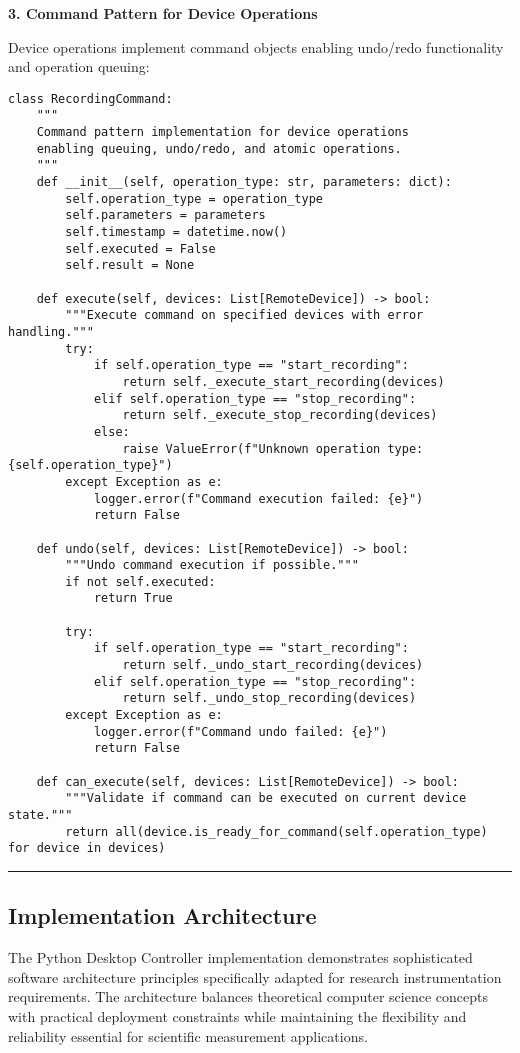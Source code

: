 \documentclass[12pt,a4paper]{article}
\begin{document}
\textbf{3. Command Pattern for Device Operations}

Device operations implement command objects enabling undo/redo functionality and operation queuing:

\begin{verbatim}
class RecordingCommand:
    """
    Command pattern implementation for device operations
    enabling queuing, undo/redo, and atomic operations.
    """
    def __init__(self, operation_type: str, parameters: dict):
        self.operation_type = operation_type
        self.parameters = parameters
        self.timestamp = datetime.now()
        self.executed = False
        self.result = None
    
    def execute(self, devices: List[RemoteDevice]) -> bool:
        """Execute command on specified devices with error handling."""
        try:
            if self.operation_type == "start_recording":
                return self._execute_start_recording(devices)
            elif self.operation_type == "stop_recording":
                return self._execute_stop_recording(devices)
            else:
                raise ValueError(f"Unknown operation type: {self.operation_type}")
        except Exception as e:
            logger.error(f"Command execution failed: {e}")
            return False
    
    def undo(self, devices: List[RemoteDevice]) -> bool:
        """Undo command execution if possible."""
        if not self.executed:
            return True
        
        try:
            if self.operation_type == "start_recording":
                return self._undo_start_recording(devices)
            elif self.operation_type == "stop_recording":
                return self._undo_stop_recording(devices)
        except Exception as e:
            logger.error(f"Command undo failed: {e}")
            return False
    
    def can_execute(self, devices: List[RemoteDevice]) -> bool:
        """Validate if command can be executed on current device state."""
        return all(device.is_ready_for_command(self.operation_type) for device in devices)
\end{verbatim}

\hrule

\subsection{Implementation Architecture}

The Python Desktop Controller implementation demonstrates sophisticated software architecture principles specifically
adapted for research instrumentation requirements. The architecture balances theoretical computer science concepts with
practical deployment constraints while maintaining the flexibility and reliability essential for scientific measurement
applications.
\end{document}
